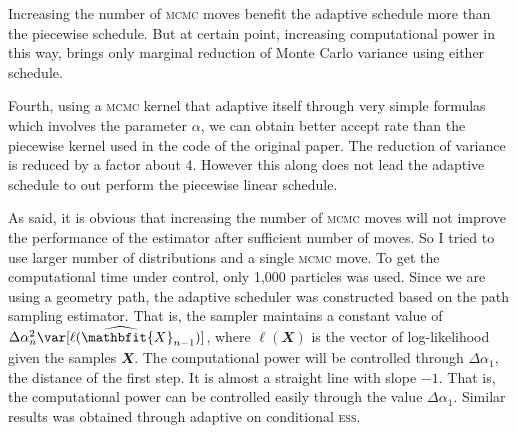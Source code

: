 \documentclass[11pt, fontset = Minion]{marticle}
\def\ess{\textsc{ess}\xspace}
\def\mcmc{\textsc{mcmc}\xspace}
\def\X{\mathbfit{X}}
\begin{document}
  Increasing the number of \mcmc moves benefit the adaptive schedule more than
  the piecewise schedule. But at certain point, increasing computational power
  in this way, brings only marginal reduction of Monte Carlo variance using
  either schedule.

  Fourth, using a \mcmc kernel that adaptive itself through very simple
  formulas which involves the parameter $\alpha$, we can obtain better accept
  rate than the piecewise kernel used in the code of the original paper. The
  reduction of variance is reduced by a factor about 4. However this along
  does not lead the adaptive schedule to out perform the piecewise linear
  schedule.

  As said, it is obvious that increasing the number of \mcmc moves will not
  improve the performance of the estimator after sufficient number of moves.
  So I tried to use larger number of distributions and a single \mcmc move. To
  get the computational time under control, only 1,000 particles was used.
  Since we are using a geometry path, the adaptive scheduler was constructed
  based on the path sampling estimator. That is, the sampler maintains a
  constant value of $\Delta\alpha_n^2\widehat{\var[\ell(\X_{n-1})]}$, where
  $\ell(\X)$ is the vector of log-likelihood given the samples $\X$. The
  computational power will be controlled through $\Delta\alpha_1$, the
  distance of the first step. It is almost a straight line with slope $-1$.
  That is, the computational power can be controlled easily through the value
  $\Delta\alpha_1$. Similar results was obtained through adaptive on
  conditional \ess.
\end{document}
